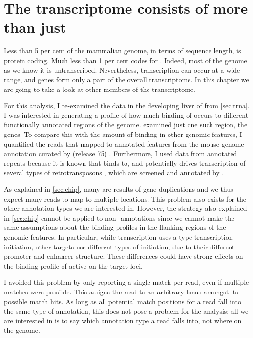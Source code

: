 \chapter{The  transcriptome consists of more than just }
\label{sec:pol3}

Less than \num{5} per cent of the mammalian genome, in terms of sequence length,
is protein coding. Much less than \num{1} per cent codes for \trna[s]. Indeed,
most of the genome as we know it is untranscribed\todo[ref]{}. Nevertheless,
 transcription can occur at a wide range, and \trna genes form only a part
of the overall  transcriptome. In this chapter we are going to take a look
at other members of the  transcriptome.

For this analysis, I re-examined the \chipseq data in the developing liver of
\mmu from \cref{sec:trna}. I was interested in generating a profile of how much
binding of  occurs to different functionally annotated regions of the
genome.  examined just one such region, the \trna genes. To
compare this with the amount of binding in other genomic features, I quantified
the \chipseq reads that mapped to annotated features from the 
mouse genome annotation curated by  (release \num{75})
\citep{Flicek:2014}. Furthermore, I used data from annotated repeats because it
is known that  binds to, and potentially drives transcription of several
types of retrotransposons \citep{Carriere:2012}, which are screened and
annotated by  \citep{Smit:2014}.

As explained in \cref{sec:chip}, many \trna[s] are results of gene duplications
and we thus expect many reads to map to multiple locations. This problem also
exists for the other annotation types we are interested in. However, the
strategy also explained in \cref{sec:chip} cannot be applied to non-\trna
annotations since we cannot make the same assumptions about the binding
profiles in the flanking regions of the genomic features. In particular, while
\trna transcription uses a type  transcription initiation, other
 targets use different types of initiation, due to their different promoter
and enhancer structure. These differences could have strong effects on the
binding profile of active  on the target loci.

I avoided this problem by only reporting a single match per read, even if
multiple matches were possible. This assigns the read to an arbitrary locus
amongst its possible match hits. As long as all potential match positions for a
read fall into the same type of annotation, this does not pose a problem for the
analysis: all we are interested in is to say which annotation type a read falls
into, not where on the genome.

